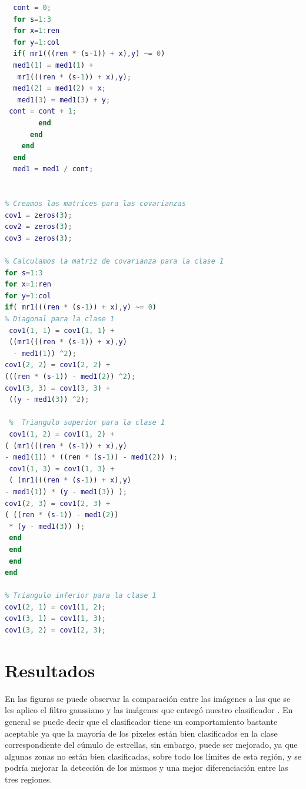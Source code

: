 \documentclass[10pt,journal,compsoc]{IEEEtran}\usepackage[T1]{fontenc}                              %
\begin{document}
\begin{lstlisting}[language=Matlab, basicstyle=\small]
  % Calculamos la media para la clase 1
  cont = 0;
  for s=1:3
  for x=1:ren
  for y=1:col
  if( mr1(((ren * (s-1)) + x),y) ~= 0)
  med1(1) = med1(1) +
   mr1(((ren * (s-1)) + x),y);
  med1(2) = med1(2) + x;
   med1(3) = med1(3) + y;
 cont = cont + 1;
        end
      end
    end
  end
  med1 = med1 / cont;


% Creamos las matrices para las covarianzas
cov1 = zeros(3);
cov2 = zeros(3);
cov3 = zeros(3);

% Calculamos la matriz de covarianza para la clase 1
for s=1:3
for x=1:ren
for y=1:col
if( mr1(((ren * (s-1)) + x),y) ~= 0)
% Diagonal para la clase 1
 cov1(1, 1) = cov1(1, 1) + 
 ((mr1(((ren * (s-1)) + x),y)
  - med1(1)) ^2);
cov1(2, 2) = cov1(2, 2) + 
(((ren * (s-1)) - med1(2)) ^2);
cov1(3, 3) = cov1(3, 3) +
 ((y - med1(3)) ^2);
            
 %  Triangulo superior para la clase 1
 cov1(1, 2) = cov1(1, 2) + 
( (mr1(((ren * (s-1)) + x),y)
- med1(1)) * ((ren * (s-1)) - med1(2)) );
 cov1(1, 3) = cov1(1, 3) +
 ( (mr1(((ren * (s-1)) + x),y)
- med1(1)) * (y - med1(3)) );
cov1(2, 3) = cov1(2, 3) + 
( ((ren * (s-1)) - med1(2))
 * (y - med1(3)) );
 end
 end
 end
end

% Triangulo inferior para la clase 1
cov1(2, 1) = cov1(1, 2);
cov1(3, 1) = cov1(1, 3);
cov1(3, 2) = cov1(2, 3);
\end{lstlisting}

\section{Resultados}


En las figuras se puede observar la comparación entre las imágenes a las que se les aplico el filtro gaussiano y las imágenes que entregó nuestro clasificador .
En general se puede decir que el clasificador tiene un comportamiento bastante aceptable ya que la mayoría de los pixeles están bien clasificados en la clase correspondiente del cúmulo de estrellas, sin embargo, puede ser mejorado, ya que algunas zonas no están bien clasificadas, sobre todo los límites de esta región, y se podría mejorar la detección de los mismos y una mejor diferenciación entre las tres regiones.

\graphicspath{{ReporteImagenes/}}
\end{document}
